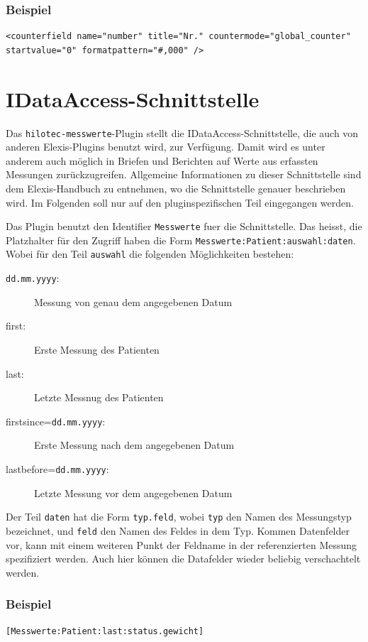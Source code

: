 \documentclass[a4paper]{scrartcl}
\begin{document}
\subsubsection{Beispiel}
\begin{lstlisting}
<counterfield name="number" title="Nr." countermode="global_counter"
startvalue="0" formatpattern="#,000" />
\end{lstlisting}
\section{IDataAccess-Schnittstelle}
Das \texttt{hilotec-messwerte}-Plugin stellt die IDataAccess-Schnittstelle, die
auch von an\-de\-ren Elexis-Plugins benutzt wird, zur Verfügung. Damit wird es unter
anderem auch möglich in Briefen und Berichten auf Werte aus erfassten Messungen
zurückzugreifen. Allgemeine Informationen zu dieser Schnittstelle sind dem
Elexis-Handbuch zu ent\-neh\-men, wo die Schnittstelle genauer beschrieben wird. Im
Folgenden soll nur auf den plug\-in\-spe\-zi\-fi\-schen Teil eingegangen werden.

Das Plugin benutzt den Identifier \texttt{Messwerte} fuer die Schnittstelle. Das
heisst, die Platzhalter für den Zugriff haben die Form
\texttt{Messwerte:Patient:auswahl:daten}. Wobei für den Teil \texttt{auswahl} die
folgenden Möglichkeiten bestehen:
\begin{description}
    \item[\texttt{dd.mm.yyyy}:] Messung von genau dem angegebenen Datum
    \item[first:] Erste Messung des Patienten
    \item[last:] Letzte Messnug des Patienten
    \item[firstsince=\texttt{dd.mm.yyyy}:] Erste Messung nach dem angegebenen
                                           Datum
    \item[lastbefore=\texttt{dd.mm.yyyy}:] Letzte Messung vor dem angegebenen
                                           Datum
\end{description}

Der Teil \texttt{daten} hat die Form \texttt{typ.feld}, wobei \texttt{typ} den
Namen des Messungstyp bezeichnet, und \texttt{feld} den Namen des Feldes in dem
Typ. Kommen Datenfelder vor, kann mit einem weiteren Punkt der Feldname in der
referenzierten Messung spezifiziert werden. Auch hier können die Datafelder
wieder beliebig verschachtelt werden.

\subsubsection{Beispiel}
\begin{lstlisting}
[Messwerte:Patient:last:status.gewicht]
\end{lstlisting}
\end{document}
